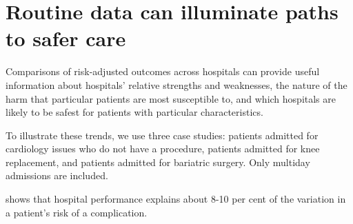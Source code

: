 \documentclass[FrontPage]{grattan}
\begin{document}
\section{Routine data can illuminate paths to safer care}\label{sec:routine-data-can-illuminate-paths-to-safer-care}

Comparisons of risk-adjusted outcomes across hospitals can provide useful information about hospitals' relative strengths and weaknesses, the nature of the harm that particular patients are most susceptible to, and which hospitals are likely to be safest for patients with particular characteristics.

To illustrate these trends, we use three case studies: patients admitted for cardiology issues who do not have a procedure, patients admitted for knee replacement, and patients admitted for bariatric surgery.
Only multiday admissions are included.

 shows that hospital performance explains about 8-10 per cent of the variation in a patient's risk of a complication.
\end{document}
